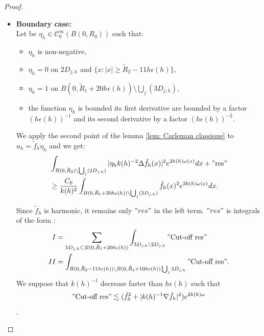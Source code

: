 \documentclass[leqno,11pt,letterpaper, english]{amsart}
\newcommand{\nn}{\nonumber}
\theoremstyle{plain}
\theoremstyle{definition}
\numberwithin{equation}{section}
\begin{document}
\begin{proof}
\begin{itemize}
			\begin{align}
				&\int_{B(0,\tilde{R})\setminus \bigcup_j(3D_{j,h})} \tilde{f}_h(x)^2dx+e^{-C_2 k(h)} \int_{B(0,\tilde{R}_0)\setminus B(0,\frac{1}{2}\tilde{R}_0)\bigcup_j 3D_{j,h}} \tilde{f}_h(x)^2dx\nn\\
				&\geq e^{-C_1 k(h)} \int_{B(0,\frac{1}{2}\tilde{R}_0)\setminus \frac{3}{4} B(0,\tilde{R})\bigcup_j(3D_{j,h})} \tilde{f}_h(x)^2dx 
			\end{align}
			with $0<C_1<C_2$.
			\hfill\\
			\item \textbf{Boundary case:}\\
			Let be $\eta_h \in \mathcal{C}_0^\infty(B(0,R_0))$ such that:
			\begin{itemize}
				\item $\eta_h$ is non-negative,
				\item $\eta_h=0$ on $2D_{j,h}$ and $\{x:|x|\geq \tilde{R}_2-11h\epsilon(h)\}$,
				\item $\eta_h=1$ on $B(0,\tilde{R}_1+20h\epsilon(h))\setminus \bigcup_j(3D_{j,h})$,
				\item the function $\eta_h$ is bounded its first derivative are bounded by a factor ${(h\epsilon(h))^{-1}}$ and its second derivative  by a factor ${(h\epsilon(h))^{-2}}$.
			\end{itemize}
			
			We apply the second point of the lemma \ref{lem: Carleman classique} to $u_h=\tilde{f}_h \eta_h$ and we get:			
			\begin{align}
				&\int_{B(0,\tilde{R}_2)\setminus \bigcup_j(2D_{j,h})} |\eta_h k(h)^{-2}\Delta \tilde{f}_h(x)|^2 e^{2k(h)\omega(x)}dx + "\mbox{res}"\nn\\
				&\geq \frac{C_0}{k(h)^2}\int_{B(0,\tilde{R}_1+20h\epsilon(h))\setminus \bigcup_j(3D_{j,h})} \tilde{f}_h(x)^2 e^{2k(h)\omega(x)}dx.
			\end{align}
			
Since $\tilde{f}_h$ is harmonic, it remains only $"res"$ in the left term. $"res"$ is integrals of the form :			
			\begin{align}
				I&=\sum_{5D_{j,h}\subset B(0,\tilde{R}_1+20h\epsilon(h))}\int_{3D_{j,h}\setminus 2D_{j,h}} "\mbox{Cut-off res}"\\
				II&=\int_{B(0,\tilde{R}_2-11h\epsilon(h))\setminus B(0,\tilde{R}_1+10h\epsilon(h))\bigcup_j 2D_{j,h}}"\mbox{Cut-off res}".\\
			\end{align}
We suppose that $k(h)^{-1}$ decrease faster than $h\epsilon(h)$ such that 
			 $$"\mbox{Cut-off res}" \lesssim(\tilde{f}_h^2 +|k(h)^{-1} \nabla \tilde{f}_h|^2)e^{2k(h)\omega}$$.
			

\end{itemize}
\end{proof}
\end{document}
